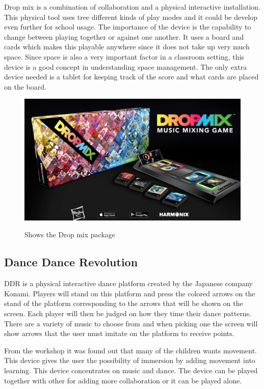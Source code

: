 Drop mix is a combination of collaboration and a physical interactive installation. This physical tool uses tree different kinds of play modes and it could be develop even further for school usage. The importance of the device is the capability to change between playing together or against one another. It uses a board and cards which makes this playable anywhere since it does not take up very much space. Since space is also a very important factor in a classroom setting, this device is a good concept in understanding space management. The only extra device needed is a tablet for keeping track of the score and what cards are placed on the board. 

\begin{figure}[H]
	\centering
	\includegraphics[width=0.7\linewidth]{figure/Analysis/dropmix}
	\label{fig:dropmix}
	\caption{Shows the Drop mix package}
\end{figure}


\subsection{Dance Dance Revolution}
DDR is a physical interactive dance platform created by the Japanese company Konami. Players will stand on this platform and press the colored arrows on the stand of the platform corresponding to the arrows that will be shown on the screen. Each player will then be judged on how they time their dance patterns. There are a variety of music to choose from and when picking one the screen will show arrows that the user must imitate on the platform to receive points. 

From the workshop it was found out that many of the children wants movement. This device gives the user the possibility of immersion by adding movement into learning. This device concentrates on music and dance. The device can be played together with other for adding more collaboration or it can be played alone. 

